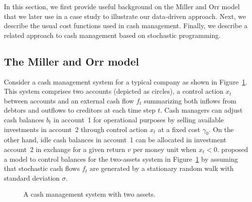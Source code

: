 In this section, we first provide useful background on the Miller and Orr model that we later use in a case study to illustrate our data-driven approach. Next, we describe the usual cost functions used in cash management. Finally, we describe a related approach to cash management based on stochastic programming.

\subsection{The Miller and Orr model}


Consider a cash management system for a typical company as shown in Figure~\ref{fig:system}. This system comprises two accounts (depicted as circles), a control action $x_t$ between accounts and an external cash flow $f_t$ summarizing both inflows from debtors and outflows to creditors at each time step $t$. Cash managers can adjust cash balances $b_t$ in account~1 for operational purposes by selling available investments in account~2 through control action $x_t$ at a fixed cost $\gamma_0$. On the other hand, idle cash balances in account~1 can be allocated in investment account~2 in exchange for a given return $v$ per money unit when $x_t<0$. \cite{miller1966model} proposed a model to control balances for the two-assets system in Figure~\ref{fig:system} by assuming that stochastic cash flows $f_t$ are generated by a stationary random walk with standard deviation $\sigma$.


\begin{figure}[htb]
\centering
{}
\caption{\label{fig:system}A cash management system with two assets.}
\end{figure}


